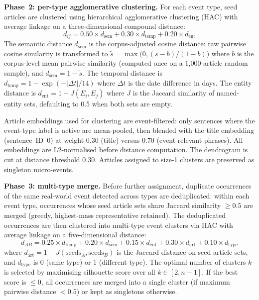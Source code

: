 \textbf{Phase~2: per-type agglomerative clustering.} For each event type, seed articles are clustered using hierarchical agglomerative clustering (HAC) with average linkage on a three-dimensional compound distance:
\begin{equation}
d_{ij} = 0.50 \times d_{\text{sem}} + 0.30 \times d_{\text{temp}} + 0.20 \times d_{\text{ent}}
\end{equation}
The semantic distance $d_{\text{sem}}$ is the corpus-adjusted cosine distance: raw pairwise cosine similarity is transformed to $\tilde{s} = \max\bigl(0, (s - b)/(1-b)\bigr)$ where $b$ is the corpus-level mean pairwise similarity (computed once on a 1,000-article random sample), and $d_{\text{sem}} = 1 - \tilde{s}$. The temporal distance is $d_{\text{temp}} = 1 - \exp(-|\Delta t|/14)$ where $\Delta t$ is the date difference in days. The entity distance is $d_{\text{ent}} = 1 - J(E_i, E_j)$ where $J$ is the Jaccard similarity of named-entity sets, defaulting to 0.5 when both sets are empty.

Article embeddings used for clustering are event-filtered: only sentences where the event-type label is active are mean-pooled, then blended with the title embedding (sentence~ID~0) at weight 0.30 (title) versus 0.70 (event-relevant phrases). All embeddings are L2-normalised before distance computation. The dendrogram is cut at distance threshold 0.30. Articles assigned to size-1 clusters are preserved as singleton micro-events.

\textbf{Phase~3: multi-type merge.} Before further assignment, duplicate occurrences of the same real-world event detected across types are deduplicated: within each event type, occurrences whose seed article sets share Jaccard similarity $\geq 0.5$ are merged (greedy, highest-mass representative retained). The deduplicated occurrences are then clustered into multi-type event clusters via HAC with average linkage on a five-dimensional distance:
\begin{equation}
d_{AB} = 0.25 \times d_{\text{temp}} + 0.20 \times d_{\text{sem}} + 0.15 \times d_{\text{ent}} + 0.30 \times d_{\text{art}} + 0.10 \times d_{\text{type}}
\end{equation}
where $d_{\text{art}} = 1 - J(\text{seeds}_A, \text{seeds}_B)$ is the Jaccard distance on seed article sets, and $d_{\text{type}}$ is 0 (same type) or 1 (different type). The optimal number of clusters $k$ is selected by maximising silhouette score over all $k \in [2, n-1]$. If the best score is $\leq 0$, all occurrences are merged into a single cluster (if maximum pairwise distance $< 0.5$) or kept as singletons otherwise.

